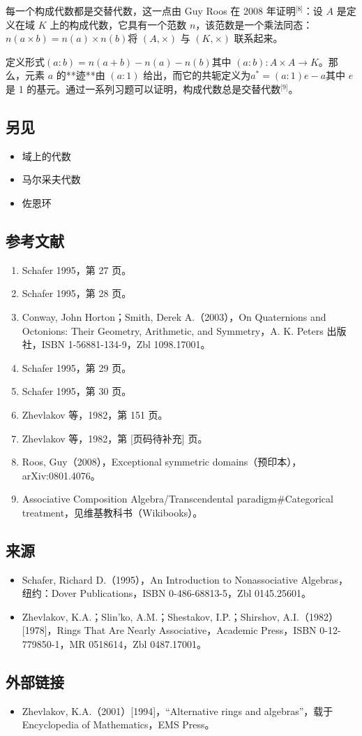 每一个构成代数都是交替代数，这一点由 Guy Roos 在 2008 年证明\(^\text{[8]}\)：设 $A$ 是定义在域 $K$ 上的构成代数，它具有一个范数 $n$，该范数是一个乘法同态：$n(a \times b) = n(a) \times n(b)$将 $(A, \times)$ 与 $(K, \times)$ 联系起来。

定义形式$(a : b) = n(a+b) - n(a) - n(b)$其中 $(a : b) \colon A \times A \to K$。那么，元素 $a$ 的**迹**由 $(a : 1)$ 给出，而它的共轭定义为$a^* = (a : 1)e - a$其中 $e$ 是 1 的基元。通过一系列习题可以证明，构成代数总是交替代数\(^\text{[9]}\)。
\subsection{另见}
\begin{itemize}
\item 域上的代数
\item 马尔采夫代数
\item 佐恩环
\end{itemize}
\subsection{参考文献}
\begin{enumerate}
\item Schafer 1995，第 27 页。
\item Schafer 1995，第 28 页。
\item Conway, John Horton；Smith, Derek A.（2003），On Quaternions and Octonions: Their Geometry, Arithmetic, and Symmetry，A. K. Peters 出版社，ISBN 1-56881-134-9，Zbl 1098.17001。
\item Schafer 1995，第 29 页。
\item Schafer 1995，第 30 页。
\item Zhevlakov 等，1982，第 151 页。
\item Zhevlakov 等，1982，第 [页码待补充] 页。
\item Roos, Guy（2008），Exceptional symmetric domains（预印本），arXiv:0801.4076。
\item Associative Composition Algebra/Transcendental paradigm#Categorical treatment，见维基教科书（Wikibooks）。
\end{enumerate}
\subsection{来源}
\begin{itemize}
\item Schafer, Richard D.（1995），An Introduction to Nonassociative Algebras，纽约：Dover Publications，ISBN 0-486-68813-5，Zbl 0145.25601。
\item Zhevlakov, K.A.；Slin'ko, A.M.；Shestakov, I.P.；Shirshov, A.I.（1982）[1978]，Rings That Are Nearly Associative，Academic Press，ISBN 0-12-779850-1，MR 0518614，Zbl 0487.17001。
\end{itemize}
\subsection{外部链接}
\begin{itemize}
\item Zhevlakov, K.A.（2001）[1994]，“Alternative rings and algebras”，载于 Encyclopedia of Mathematics，EMS Press。
\end{itemize}